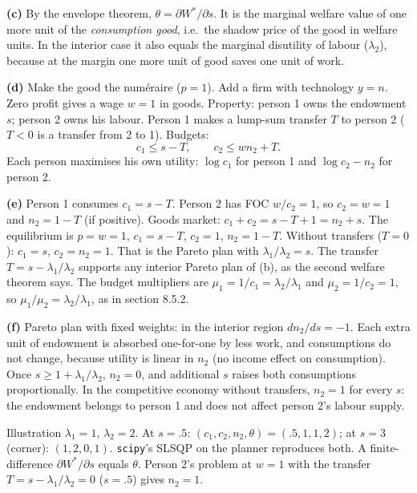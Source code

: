 \documentclass[12pt, letterpaper]{article}
\begin{document}
\begin{tcolorbox}[oddbox,title={Exercise 8.1 \quad Family economics, I}]
\textbf{(c)} By the envelope theorem, $\theta=\partial W^{\ast}/\partial s$. It is the marginal welfare value of one more
unit of the \emph{consumption good}, i.e.\ the shadow price of the good in welfare units. In the interior case
it also equals the marginal disutility of labour ($\lambda_2$), because at the margin one more unit of good
saves one unit of work.

\textbf{(d)} Make the good the num\'eraire ($p=1$). Add a firm with technology $y=n$. Zero profit gives a
wage $w=1$ in goods. Property: person 1 owns the endowment $s$; person 2 owns his labour. Person 1 makes a
lump-sum transfer $T$ to person 2 ($T<0$ is a transfer from 2 to 1). Budgets:
\[
c_1\le s-T,\qquad c_2\le wn_2+T .
\]
Each person maximises his own utility: $\log c_1$ for person 1 and $\log c_2-n_2$ for person 2.

\textbf{(e)} Person 1 consumes $c_1=s-T$. Person 2 has FOC $w/c_2=1$, so $c_2=w=1$ and $n_2=1-T$ (if positive).
Goods market: $c_1+c_2=s-T+1=n_2+s$. \checkmark{} The equilibrium is $p=w=1$, $c_1=s-T$, $c_2=1$, $n_2=1-T$.
Without transfers ($T=0$): $c_1=s$, $c_2=n_2=1$. That is the Pareto plan with $\lambda_1/\lambda_2=s$. The transfer
$T=s-\lambda_1/\lambda_2$ supports any interior Pareto plan of (b), as the second welfare theorem says. The budget multipliers are
$\mu_1=1/c_1=\lambda_2/\lambda_1$ and $\mu_2=1/c_2=1$, so $\mu_1/\mu_2=\lambda_2/\lambda_1$, as in section 8.5.2.

\textbf{(f)} Pareto plan with fixed weights: in the interior region $dn_2/ds=-1$. Each extra unit of endowment is
absorbed one-for-one by less work, and consumptions do not change, because utility is linear in $n_2$ (no income
effect on consumption). Once $s\ge1+\lambda_1/\lambda_2$, $n_2=0$, and additional $s$ raises both consumptions
proportionally. In the competitive economy without transfers, $n_2=1$ for every $s$: the endowment belongs to
person 1 and does not affect person 2's labour supply.

\begin{tcolorbox}[databox]
Illustration $\lambda_1=1$, $\lambda_2=2$. At $s=.5$: $(c_1,c_2,n_2,\theta)=(.5,1,1,2)$; at $s=3$ (corner):
$(1,2,0,1)$. \texttt{scipy}'s SLSQP on the planner reproduces both. A finite-difference $\partial W^\ast/\partial s$ equals
$\theta$. Person 2's problem at $w=1$ with the transfer $T=s-\lambda_1/\lambda_2=0$ ($s=.5$) gives $n_2=1$.
\end{tcolorbox}
\end{tcolorbox}
\end{document}
